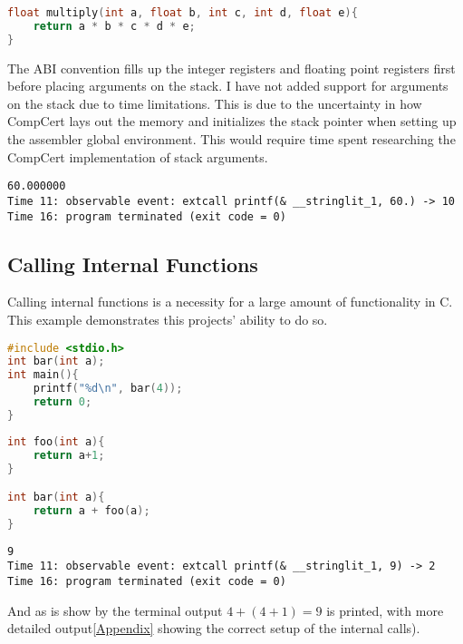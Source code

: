 \begin{lstlisting}[language=C, caption=mixed.c]
float multiply(int a, float b, int c, int d, float e){
    return a * b * c * d * e;
}
\end{lstlisting}

The ABI convention fills up the integer registers and floating point registers first before placing arguments on the stack. I have not added support for arguments on the stack due to time limitations. This is due to the uncertainty in how CompCert lays out the memory and initializes the stack pointer when setting up the assembler global environment. This would require time spent researching the CompCert implementation of stack arguments.

\begin{lstlisting}[frame=lrtb, numbers=none, caption =\texttt{\$ ccomp -interp call\_mixed.c -link mixed.o}]
60.000000
Time 11: observable event: extcall printf(& __stringlit_1, 60.) -> 10
Time 16: program terminated (exit code = 0)
\end{lstlisting}

\subsection{Calling Internal Functions}

Calling internal functions is a necessity for a large amount of functionality in C. This example demonstrates this projects' ability to do so.

\begin{multicols}{2}
\begin{lstlisting}[language=C]
#include <stdio.h>
int bar(int a);
int main(){
    printf("%d\n", bar(4));
    return 0;
}
\end{lstlisting}

\begin{lstlisting}[language=C]
int foo(int a){
    return a+1;
}

int bar(int a){
    return a + foo(a);
}
\end{lstlisting}
\end{multicols}

\begin{lstlisting}[frame=lrbt, numbers=none, caption=\texttt{\$ ccomp -interp call\_malloc\_free.c -link malloc\_free.o}]
9
Time 11: observable event: extcall printf(& __stringlit_1, 9) -> 2
Time 16: program terminated (exit code = 0)
\end{lstlisting}

And as is show by the terminal output $4+(4+1)=9$ is printed, with more detailed output\ref{Appendix} showing the correct setup of the internal calls).


